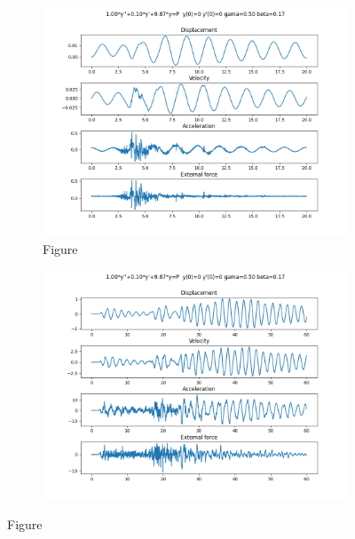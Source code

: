 \begin{figure}[!t]
    \centering
    \begin{subfigure}[b]{0.45\textwidth}
        \centering
        \includegraphics[width=\textwidth]{images/f1.png}
        \caption{Figure}
        \label{tab:wave1}
    \end{subfigure}
    \hfill
    \begin{subfigure}[b]{0.45\textwidth}
        \centering
        \includegraphics[width=\textwidth]{images/f2.png}
        \caption{}
        \label{tab:wave2}
    \end{subfigure}
    \hspace{1em}
    \caption{Figure}
    \label{tab:wave}
\end{figure}


